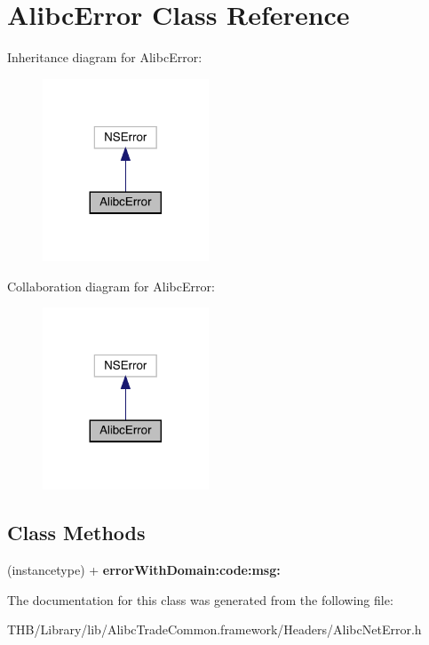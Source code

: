 \hypertarget{interface_alibc_error}{}\section{Alibc\+Error Class Reference}
\label{interface_alibc_error}


Inheritance diagram for Alibc\+Error\+:\nopagebreak
\begin{figure}[H]
\begin{center}
\leavevmode
\includegraphics[width=140pt]{interface_alibc_error__inherit__graph}
\end{center}
\end{figure}


Collaboration diagram for Alibc\+Error\+:\nopagebreak
\begin{figure}[H]
\begin{center}
\leavevmode
\includegraphics[width=140pt]{interface_alibc_error__coll__graph}
\end{center}
\end{figure}
\subsection*{Class Methods}
\begin{DoxyCompactItemize}
\item 
\mbox{\label{interface_alibc_error_abacca48f3ec53f95b4996758a10a82eb}} 
(instancetype) + {\bfseries error\+With\+Domain\+:code\+:msg\+:}
\end{DoxyCompactItemize}


The documentation for this class was generated from the following file\+:\begin{DoxyCompactItemize}
\item 
T\+H\+B/\+Library/lib/\+Alibc\+Trade\+Common.\+framework/\+Headers/Alibc\+Net\+Error.\+h\end{DoxyCompactItemize}
